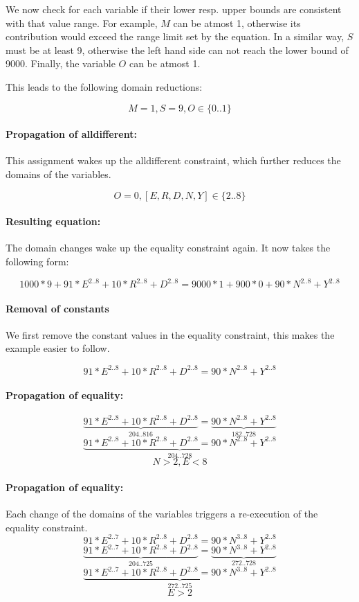 \documentclass[a4paper]{article}
\begin{document}
We now check for each variable if their lower resp. upper bounds are consistent with that value range. For example, $M$ can be atmost 1, otherwise its contribution would exceed the range limit set by the equation. In a similar way, $S$ must be at least 9, otherwise the left hand side can not reach the lower bound of 9000. Finally, the variable $O$ can be atmost 1. 

This leads to the following domain reductions:

\[
M = 1, S = 9, O \in \{0..1\}
\]

\paragraph{Propagation of alldifferent:} This assignment wakes up the alldifferent constraint, which further reduces the domains of the variables.

\[
O = 0, [E,R,D,N,Y] \in \{2..8\}
\]

\paragraph{Resulting equation:} The domain changes wake up the equality constraint again. It now takes the following form:

\[
1000*9 + 91*E^{2..8} + 10*R^{2..8} + D^{2..8} = 9000*1 + 900*0+ 90*N^{2..8} + Y^{2..8}
\]

\paragraph{Removal of constants} We first remove the constant values in the equality constraint, this makes the example easier to follow.

\[
91*E^{2..8}+10*R^{2..8}+D^{2..8} = 90*N^{2..8}+Y^{2..8}
\]

\paragraph{Propagation of equality:}

\[
\underbrace{91*E^{2..8}+10*R^{2..8}+D^{2..8}}_{204..816} = \underbrace{90*N^{2..8}+Y^{2..8}}_{182..728}
\]
\[
\underbrace{91*E^{2..8}+10*R^{2..8}+D^{2..8} = 90*N^{2..8}+Y^{2..8}}_{204..728}
\]
\[
N > 2, E < 8
\]

\paragraph{Propagation of equality:}
Each change of the domains of the variables triggers a re-execution of the equality constraint.
\[
91*E^{2..7}+10*R^{2..8}+D^{2..8} = 90*N^{3..8}+Y^{2..8}
\]
\[
\underbrace{91*E^{2..7}+10*R^{2..8}+D^{2..8}}_{204..725} = \underbrace{90*N^{3..8}+Y^{2..8}}_{272..728}
\]
\[
\underbrace{91*E^{2..7}+10*R^{2..8}+D^{2..8} = 90*N^{3..8}+Y^{2..8}}_{272..725}
\]
\[
E > 2
\]
\end{document}
